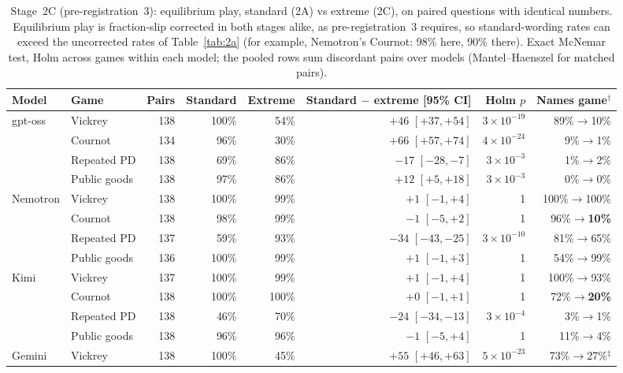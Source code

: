 \documentclass[10pt]{article}
\theoremstyle{definition}
\theoremstyle{remark}
\begin{document}
\begin{table}[t]
\centering
\caption{Stage~2C (pre-registration~3): equilibrium play, standard (2A) vs extreme (2C), on paired
questions with identical numbers. Equilibrium play is fraction-slip corrected in both stages
alike, as pre-registration~3 requires, so standard-wording rates can exceed the uncorrected
rates of Table~\ref{tab:2a} (for example, Nemotron's Cournot: 98\% here, 90\% there). Exact
McNemar test, Holm across games within each model; the pooled rows sum discordant pairs over
models (Mantel--Haenszel for matched pairs).}
\label{tab:2c}
\footnotesize
\setlength{\tabcolsep}{4pt}
\begin{tabular}{@{}llrrrrrr@{}}
\toprule
Model & Game & Pairs & Standard & Extreme & Standard $-$ extreme [95\% CI] & Holm $p$ & Names game$^\dagger$ \\
\midrule
gpt-oss  & Vickrey      & 138 & 100\% & 54\% & $+46$ $[+37,+54]$ & $3\times10^{-19}$ & 89\%$\to$10\% \\
         & Cournot      & 134 & 96\%  & 30\% & $+66$ $[+57,+74]$ & $4\times10^{-24}$ & 9\%$\to$1\% \\
         & Repeated PD  & 138 & 69\%  & 86\% & $-17$ $[-28,-7]$ & $3\times10^{-3}$ & 1\%$\to$2\% \\
         & Public goods & 138 & 97\%  & 86\% & $+12$ $[+5,+18]$ & $3\times10^{-3}$ & 0\%$\to$0\% \\
\midrule
Nemotron & Vickrey      & 138 & 100\% & 99\% & $+1$ $[-1,+4]$ & 1 & 100\%$\to$100\% \\
         & Cournot      & 138 & 98\%  & 99\% & $-1$ $[-5,+2]$ & 1 & 96\%$\to$\textbf{10\%} \\
         & Repeated PD  & 137 & 59\%  & 93\% & $-34$ $[-43,-25]$ & $3\times10^{-10}$ & 81\%$\to$65\% \\
         & Public goods & 136 & 100\% & 99\% & $+1$ $[-1,+3]$ & 1 & 54\%$\to$99\% \\
\midrule
Kimi     & Vickrey      & 137 & 100\% & 99\% & $+1$ $[-1,+4]$ & 1 & 100\%$\to$93\% \\
         & Cournot      & 138 & 100\% & 100\% & $+0$ $[-1,+1]$ & 1 & 72\%$\to$\textbf{20\%} \\
         & Repeated PD  & 138 & 46\%  & 70\% & $-24$ $[-34,-13]$ & $3\times10^{-4}$ & 3\%$\to$1\% \\
         & Public goods & 138 & 96\%  & 96\% & $-1$ $[-5,+4]$ & 1 & 11\%$\to$4\% \\
\midrule
Gemini   & Vickrey      & 138 & 100\% & 45\% & $+55$ $[+46,+63]$ & $5\times10^{-23}$ & 73\%$\to$27\%$^\ddagger$ \\

\end{tabular}
\end{table}
\end{document}
